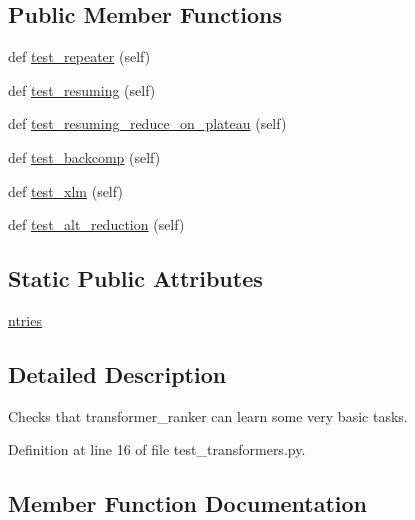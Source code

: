 \subsection*{Public Member Functions}
\begin{DoxyCompactItemize}
\item 
def \hyperlink{classtests_1_1test__transformers_1_1TestTransformerRanker_a386da89601a1778da3844cf901df3697}{test\+\_\+repeater} (self)
\item 
def \hyperlink{classtests_1_1test__transformers_1_1TestTransformerRanker_a55dff1bae7f3fef267f2437423ee008f}{test\+\_\+resuming} (self)
\item 
def \hyperlink{classtests_1_1test__transformers_1_1TestTransformerRanker_aaaf8b461c4f6460c770c1717c6cf9f5c}{test\+\_\+resuming\+\_\+reduce\+\_\+on\+\_\+plateau} (self)
\item 
def \hyperlink{classtests_1_1test__transformers_1_1TestTransformerRanker_a63dd66de96a7eee38a2bf477bd27441f}{test\+\_\+backcomp} (self)
\item 
def \hyperlink{classtests_1_1test__transformers_1_1TestTransformerRanker_a2a4671741d853fa9ff5bf484ec98487c}{test\+\_\+xlm} (self)
\item 
def \hyperlink{classtests_1_1test__transformers_1_1TestTransformerRanker_a511fbe2d896e28baff21f5c9e7f0b0b4}{test\+\_\+alt\+\_\+reduction} (self)
\end{DoxyCompactItemize}
\subsection*{Static Public Attributes}
\begin{DoxyCompactItemize}
\item 
\hyperlink{classtests_1_1test__transformers_1_1TestTransformerRanker_ac580716d99f1d6e925acdf3deee22def}{ntries}
\end{DoxyCompactItemize}


\subsection{Detailed Description}
\begin{DoxyVerb}Checks that transformer_ranker can learn some very basic tasks.
\end{DoxyVerb}
 

Definition at line 16 of file test\+\_\+transformers.\+py.



\subsection{Member Function Documentation}
\mbox{\label{classtests_1_1test__transformers_1_1TestTransformerRanker_a511fbe2d896e28baff21f5c9e7f0b0b4}} 
